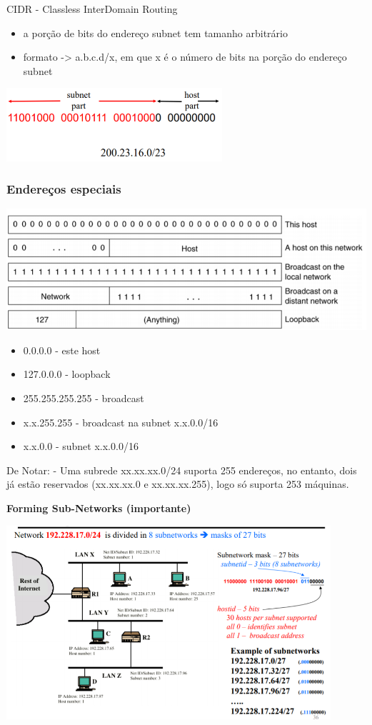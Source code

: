 \documentclass[../resumosRCOM.tex]{subfiles}
\begin{document}
CIDR - Classless InterDomain Routing
\begin{itemize}
    \item a porção de bits do endereço subnet tem tamanho arbitrário
    \item formato -> a.b.c.d/x, em que x é o número de bits na porção do endereço subnet
\end{itemize}
\begin{center}
    \includegraphics[width=8cm]{images/RCOM18.png}
\end{center}

\subsubsection{Endereços especiais}
\begin{center}
    \includegraphics[width=14cm]{images/RCOM19.png}
\end{center}
\begin{itemize}
    \item 0.0.0.0 - este host
    \item 127.0.0.0 - loopback
    \item 255.255.255.255 - broadcast
    \item x.x.255.255 - broadcast na subnet x.x.0.0/16
    \item x.x.0.0 - subnet x.x.0.0/16
\end{itemize}

De Notar: - Uma subrede xx.xx.xx.0/24 suporta 255 endereços, no entanto, dois já estão reservados (xx.xx.xx.0 e xx.xx.xx.255), logo só suporta 253 máquinas.

\textbf{Forming Sub-Networks (importante)}
\begin{center}
    \includegraphics[width=12cm]{images/RCOM20.png}
\end{center}
\end{document}
